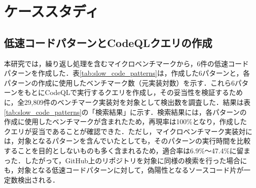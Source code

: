 \documentclass[submit,techrep,noauthor]{ipsj}
\begin{document}
\section{ケーススタディ}
\label{sec:case-study}

\subsection{低速コードパターンとCodeQLクエリの作成}
\label{subsection:pattern}

本研究では，繰り返し処理を含むマイクロベンチマークから，6件の低速コードパターンを作成した．表\ref{tab:slow_code_patterns}は，作成した6パターンと，各パターンの作成に使用したベンチマーク数（元実装対数）を示す．これら6パターンをもとにCodeQLで実行するクエリを作成し，その妥当性を検証するために，全29,809件のベンチマーク実装対を対象として検出数を調査した．結果は表\ref{tab:slow_code_patterns}の「検索結果」に示す．検索結果には，各パターンの作成に使用したベンチマークが含まれたため，再現率は100\%となり，作成したクエリが妥当であることが確認できた．ただし，マイクロベンチマーク実装対には，対象となるパターンを含んでいたとしても，そのパターンの実行時間を比較することを目的としないものも多く含まれるため，適合率は6.9\%～47.4\%に留まった．したがって，GitHub上のリポジトリを対象に同様の検索を行った場合にも，対象となる低速コードパターンに対して，偽陽性となるソースコード片が一定数検出される．
\end{document}
